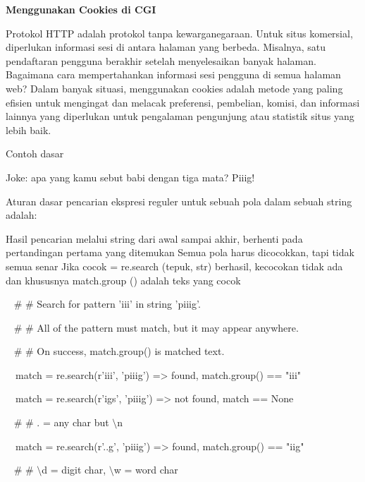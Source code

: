 \begin{12pt}
\begin{12pt}
\begin{12pt}
\begin{12pt}
\begin{12pt}
\begin{12pt}
\begin{12pt}
\noindent 
{\fontsize{14pt}{14pt}\selectfont \textbf{Menggunakan Cookies di CGI} \\} \par
\noindent 
Protokol HTTP adalah protokol tanpa kewarganegaraan. Untuk situs komersial, diperlukan informasi sesi di antara halaman yang berbeda. Misalnya, satu pendaftaran pengguna berakhir setelah menyelesaikan banyak halaman. Bagaimana cara mempertahankan informasi sesi pengguna di semua halaman web? Dalam banyak situasi, menggunakan cookies adalah metode yang paling efisien untuk mengingat dan melacak preferensi, pembelian, komisi, dan informasi lainnya yang diperlukan untuk pengalaman pengunjung atau statistik situs yang lebih baik. \par
\noindent 
Contoh dasar \par
\noindent 
Joke: apa yang kamu sebut babi dengan tiga mata? Piiig! \par
\vspace{12pt}
\noindent 
Aturan dasar pencarian ekspresi reguler untuk sebuah pola dalam sebuah string adalah: \par
\noindent 
Hasil pencarian melalui string dari awal sampai akhir, berhenti pada pertandingan pertama yang ditemukan  Semua pola harus dicocokkan, tapi tidak semua senar Jika cocok = re.search (tepuk, str) berhasil, kecocokan tidak ada dan khususnya match.group () adalah teks yang cocok \par
\vspace{12pt}
\noindent 
~  $  \#  $ $  \#  $ Search for pattern 'iii' in string 'piiig'. \par
\noindent 
~  $  \#  $ $  \#  $ All of the pattern must match, but it may appear anywhere. \par
\noindent 
~  $  \#  $ $  \#  $ On success, match.group() is matched text. \par
\noindent 
~~match = re.search(r'iii', 'piiig') =>  found, match.group() == "iii" \par
\noindent 
~~match = re.search(r'igs', 'piiig') =>  not found, match == None \par
\vspace{12pt}
\noindent 
~  $  \#  $ $  \#  $ . = any char but  $  \setminus  $n \par
\noindent 
~~match = re.search(r'..g', 'piiig') =>  found, match.group() == "iig" \par
\vspace{12pt}
\noindent 
~  $  \#  $ $  \#  $  $  \setminus  $d = digit char,  $  \setminus  $w = word char \par

\end{12pt}
\end{12pt}
\end{12pt}
\end{12pt}
\end{12pt}
\end{12pt}
\end{12pt}
